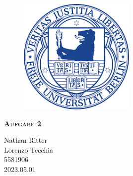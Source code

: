 \documentclass{report}
\begin{document}
\begin{center}
	
\end{center}
    \begin{figure}[htbp!]
        \begin{center}
            \includegraphics[width=0.5\textwidth]{Immagini/FUlogo.png}
        \end{center}
    \end{figure}
    
    {\centering\scshape\Large\bfseries Aufgabe 2
    \begin{center}
        Nathan Ritter  \\ 
        Lorenzo Tecchia \\ 5581906  \\ 2023.05.01
    \end{center}}


    \newpage
    
    \tableofcontents
    
    
    
    
\end{document}
